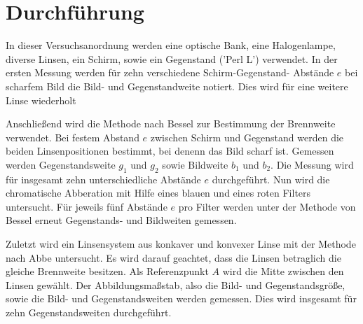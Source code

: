 \section{Durchführung}
\label{sec:Durchführung}

In dieser Versuchsanordnung werden eine optische Bank, eine Halogenlampe,
diverse Linsen, ein Schirm, sowie ein Gegenstand ('Perl L') verwendet.
In der ersten Messung werden für zehn verschiedene Schirm-Gegenstand- Abstände
$e$ bei scharfem Bild die Bild- und Gegenstandweite notiert. Dies wird
für eine weitere Linse wiederholt

\noindent Anschließend wird die Methode nach Bessel zur Bestimmung der Brennweite
verwendet. Bei festem Abstand $e$ zwischen Schirm und Gegenstand werden
die beiden Linsenpositionen bestimmt, bei denenn das Bild scharf ist.
Gemessen werden Gegenstandsweite $g_1$ und $g_2$ sowie Bildweite
$b_1$ und $b_2$. Die Messung wird für insgesamt zehn unterschiedliche
Abstände $e$ durchgeführt. Nun wird die chromatische Abberation mit Hilfe
eines blauen und eines roten Filters untersucht. Für jeweils fünf Abstände
$e$ pro Filter werden unter der Methode von Bessel erneut Gegenstands- und
Bildweiten gemessen.

\noindent Zuletzt wird ein Linsensystem aus konkaver und konvexer Linse
mit der Methode nach Abbe untersucht.
Es wird darauf geachtet, dass die Linsen betraglich die gleiche
Brennweite besitzen. Als Referenzpunkt $A$ wird die Mitte zwischen den
Linsen gewählt. Der Abbildungsmaßstab, also die Bild- und Gegenstandsgröße,
sowie die Bild- und Gegenstandsweiten werden gemessen. Dies wird insgesamt
für zehn Gegenstandsweiten durchgeführt.
